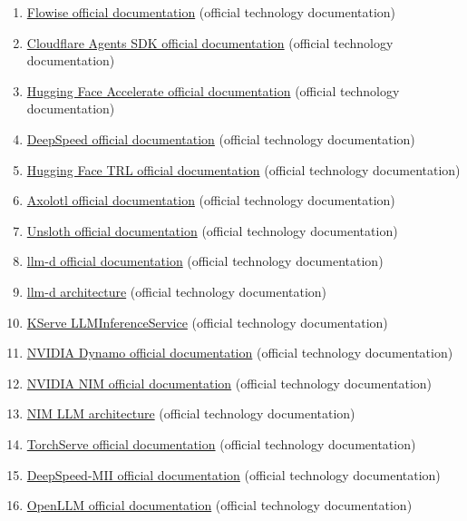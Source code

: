 \begin{enumerate}
\item \href{https://docs.flowiseai.com/}{Flowise official documentation} (official technology documentation)
\item \href{https://developers.cloudflare.com/agents/}{Cloudflare Agents SDK official documentation} (official technology documentation)
\item \href{https://huggingface.co/docs/accelerate/index}{Hugging Face Accelerate official documentation} (official technology documentation)
\item \href{https://www.deepspeed.ai/}{DeepSpeed official documentation} (official technology documentation)
\item \href{https://huggingface.co/docs/trl/index}{Hugging Face TRL official documentation} (official technology documentation)
\item \href{https://docs.axolotl.ai/}{Axolotl official documentation} (official technology documentation)
\item \href{https://docs.unsloth.ai/}{Unsloth official documentation} (official technology documentation)
\item \href{https://llm-d.ai/docs/dev}{llm-d official documentation} (official technology documentation)
\item \href{https://llm-d.ai/docs/architecture}{llm-d architecture} (official technology documentation)
\item \href{https://kserve.github.io/website/docs/model-serving/generative-inference/llmisvc/llmisvc-overview}{KServe LLMInferenceService} (official technology documentation)
\item \href{https://docs.nvidia.com/dynamo/latest/}{NVIDIA Dynamo official documentation} (official technology documentation)
\item \href{https://docs.nvidia.com/nim/large-language-models/latest/introduction.html}{NVIDIA NIM official documentation} (official technology documentation)
\item \href{https://docs.nvidia.com/nim/large-language-models/latest/reference/architecture.html}{NIM LLM architecture} (official technology documentation)
\item \href{https://docs.pytorch.org/serve/}{TorchServe official documentation} (official technology documentation)
\item \href{https://deepspeed-mii.readthedocs.io/en/latest/}{DeepSpeed-MII official documentation} (official technology documentation)
\item \href{https://github.com/bentoml/OpenLLM}{OpenLLM official documentation} (official technology documentation)

\end{enumerate}
